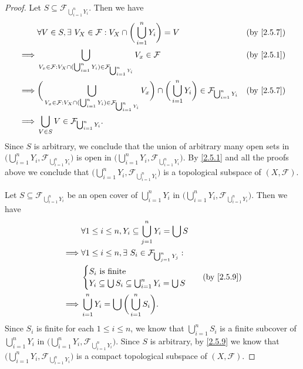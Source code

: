 \begin{proof}
  Let \(S \subseteq \mathcal{F}_{\bigcup_{i = 1}^n Y_i}\).
  Then we have
  \begin{align*}
             & \forall V \in S, \exists\ V_X \in \mathcal{F} : V_X \cap \bigg(\bigcup_{i = 1}^n Y_i\bigg) = V                                                                                                          & \text{(by \cref{2.5.7})} \\
    \implies & \bigcup_{V_x \in \mathcal{F} : V_X \cap (\bigcup_{i = 1}^n Y_i) \in \mathcal{F}_{\bigcup_{i = 1}^n Y_i}} V_x \in \mathcal{F}                                                                            & \text{(by \cref{2.5.1})} \\
    \implies & \bigg(\bigcup_{V_x \in \mathcal{F} : V_X \cap (\bigcup_{i = 1}^n Y_i) \in \mathcal{F}_{\bigcup_{i = 1}^n Y_i}} V_x\bigg) \cap \bigg(\bigcup_{i = 1}^n Y_i\bigg) \in \mathcal{F}_{\bigcup_{i = 1}^n Y_i} & \text{(by \cref{2.5.7})} \\
    \implies & \bigcup_{V \in S} V \in \mathcal{F}_{\bigcup_{i = 1}^n Y_i}.
  \end{align*}
  Since \(S\) is arbitrary, we conclude that the union of arbitrary many open sets in \(\big(\bigcup_{i = 1}^n Y_i, \mathcal{F}_{\bigcup_{i = 1}^n Y_i}\big)\) is open in \(\big(\bigcup_{i = 1}^n Y_i, \mathcal{F}_{\bigcup_{i = 1}^n Y_i}\big)\).
  By \cref{2.5.1} and all the proofs above we conclude that \(\big(\bigcup_{i = 1}^n Y_i, \mathcal{F}_{\bigcup_{i = 1}^n Y_i}\big)\) is a topological subspace of \((X, \mathcal{F})\).

  Let \(S \subseteq \mathcal{F}_{\bigcup_{i = 1}^n Y_i}\) be an open cover of \(\bigcup_{i = 1}^n Y_i\) in \(\big(\bigcup_{i = 1}^n Y_i, \mathcal{F}_{\bigcup_{i = 1}^n Y_i}\big)\).
  Then we have
  \begin{align*}
             & \forall 1 \leq i \leq n, Y_i \subseteq \bigcup_{j = 1}^n Y_i = \bigcup S        \\
    \implies & \forall 1 \leq i \leq n, \exists\ S_i \in \mathcal{F}_{\bigcup_{j = 1}^n Y_j} : \\
             & \begin{cases}
                 S_i \text{ is finite} \\
                 Y_i \subseteq \bigcup S_i \subseteq \bigcup_{i = 1}^n Y_i = \bigcup S
               \end{cases}           & \text{(by \cref{2.5.9})}            \\
    \implies & \bigcup_{i = 1}^n Y_i = \bigcup \bigg(\bigcup_{i = 1}^n S_i\bigg).
  \end{align*}
  Since \(S_i\) is finite for each \(1 \leq i \leq n\), we know that \(\bigcup_{i = 1}^n S_i\) is a finite subcover of \(\bigcup_{i = 1}^n Y_i\) in \(\big(\bigcup_{i = 1}^n Y_i, \mathcal{F}_{\bigcup_{i = 1}^n Y_i}\big)\).
  Since \(S\) is arbitrary, by \cref{2.5.9} we know that \(\big(\bigcup_{i = 1}^n Y_i, \mathcal{F}_{\bigcup_{i = 1}^n Y_i}\big)\) is a compact topological subspace of \((X, \mathcal{F})\).


\end{proof}
